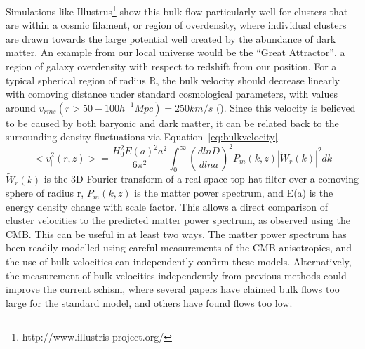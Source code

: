 \documentclass[manuscript]{aastex}
\begin{document}
Simulations like Illustrus\footnote{http://www.illustris-project.org/} show this bulk flow particularly well for clusters that are within a cosmic filament, or region of overdensity, where individual clusters are drawn towards the large potential well created by the abundance of dark matter. An example from our local universe would be the ``Great Attractor'', a region of galaxy overdensity with respect to redshift from our position. For a typical spherical region of radius R, the bulk velocity should decrease linearly with comoving distance under standard cosmological parameters, with values around \(v_{rms}(r > 50-100  h^{-1} Mpc) = 250 km/s\) (\cite{Mak2011}). Since this velocity is believed to be caused by both baryonic and dark matter, it can be related back to the surrounding density fluctuations via Equation~\ref{eq:bulkvelocity}. 
\begin{equation}\label{eq:bulkvelocity}
 <v^{2}_{\parallel}(r,z)> = \frac{H_{0}^{2}E(a)^{2}a^{2}}{6\pi^{2}} \int_{0}^{\infty} (\frac{d ln D}{d ln a})^{2} P_{m}(k,z)|\tilde{W}_{r}(k)|^{2} dk
 \end{equation}
\(\tilde{W}_{r}(k)\) is the 3D Fourier transform of a real space top-hat filter over a comoving sphere of radius r, \(P_{m}(k,z)\) is the matter power spectrum, and E(a) is the energy density change with scale factor. This allows a direct comparison of cluster velocities to the predicted matter power spectrum, as observed using the CMB. This can be useful in at least two ways. The matter power spectrum has been readily modelled using careful measurements of the CMB anisotropies, and the use of bulk velocities can independently confirm these models. Alternatively, the measurement of bulk velocities independently from previous methods could improve the current schism, where several papers have claimed bulk flows too large for the standard model, and others have found flows too low. 


\end{document}
